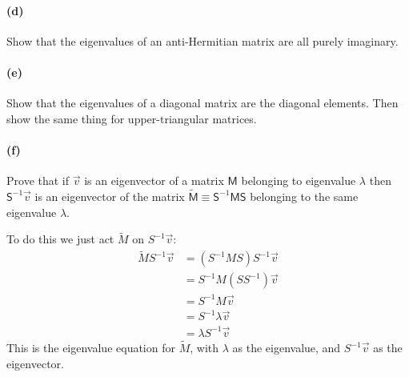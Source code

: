 \documentclass{article}
\begin{document}
\paragraph{(d)}		\extrapart
Show that the eigenvalues of an anti-Hermitian matrix are all purely imaginary.


\paragraph{(e)}		\extrapart
Show that the eigenvalues of a diagonal matrix are the diagonal elements.  Then show the same thing for upper-triangular matrices.


\paragraph{(f)}
Prove that if $\vec{v}$ is an eigenvector of a matrix $\mathsf{M}$ belonging to eigenvalue $\lambda$ then $\mathsf{S}^{-1}\vec{v}$ is an eigenvector of the matrix 
$\widetilde{\mathsf{M}}\equiv \mathsf{S}^{-1}\mathsf{MS}$ belonging to the same eigenvalue $\lambda$.\\

\begin{solution}
	To do this we just act $\tilde M$ on $S^{-1}\vec v$:
	\begin{align*}
		\tilde M S^{-1} \vec v &= (S^{-1}MS) S^{-1} \vec v\\	
							   &= S^{-1} M (S S^{-1}) \vec v \\
							   &= S^{-1}M \vec v \\
							   &= S^{-1} \lambda \vec v \\
							   &= \lambda S^{-1} \vec v
	\end{align*}
	This is the eigenvalue equation for $\tilde M$, with $\lambda$ as the eigenvalue, and $S^{-1} \vec v$ 
	as the eigenvector.
\end{solution}

\phline
\end{document}
